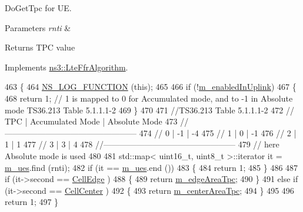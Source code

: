 Do\+Get\+Tpc for UE. 


\begin{DoxyParams}{Parameters}
{\em rnti} & \\
\hline
\end{DoxyParams}
\begin{DoxyReturn}{Returns}
T\+PC value 
\end{DoxyReturn}


Implements \hyperlink{classns3_1_1LteFfrAlgorithm_a1c58dea37b4812fcb2a817e3e1c45343}{ns3\+::\+Lte\+Ffr\+Algorithm}.


\begin{DoxyCode}
463 \{
464   \hyperlink{log-macros-disabled_8h_a90b90d5bad1f39cb1b64923ea94c0761}{NS\_LOG\_FUNCTION} (\textcolor{keyword}{this});
465 
466   \textcolor{keywordflow}{if} (!\hyperlink{classns3_1_1LteFfrAlgorithm_a6c681821267dfedf7083600005db4bee}{m\_enabledInUplink})
467     \{
468       \textcolor{keywordflow}{return} 1;     \textcolor{comment}{// 1 is mapped to 0 for Accumulated mode, and to -1 in Absolute mode TS36.213 Table
       5.1.1.1-2}
469     \}
470 
471   \textcolor{comment}{//TS36.213 Table 5.1.1.1-2}
472   \textcolor{comment}{//   TPC   |   Accumulated Mode  |  Absolute Mode}
473   \textcolor{comment}{//------------------------------------------------}
474   \textcolor{comment}{//    0    |         -1          |      -4}
475   \textcolor{comment}{//    1    |          0          |      -1}
476   \textcolor{comment}{//    2    |          1          |       1}
477   \textcolor{comment}{//    3    |          3          |       4}
478   \textcolor{comment}{//------------------------------------------------}
479   \textcolor{comment}{// here Absolute mode is used}
480 
481   std::map< uint16\_t, uint8\_t >::iterator it = \hyperlink{classns3_1_1LteFrStrictAlgorithm_a544356f4520ab4afc2af7fb03c02cf17}{m\_ues}.find (rnti);
482   \textcolor{keywordflow}{if} (it == \hyperlink{classns3_1_1LteFrStrictAlgorithm_a544356f4520ab4afc2af7fb03c02cf17}{m\_ues}.end ())
483     \{
484       \textcolor{keywordflow}{return} 1;
485     \}
486 
487   \textcolor{keywordflow}{if} (it->second == \hyperlink{classns3_1_1LteFrStrictAlgorithm_a70e144d3c83d78ebf979dbad5d191de7a263b073dd1aafaf85a35b5cb245b10e6}{CellEdge} )
488     \{
489       \textcolor{keywordflow}{return} \hyperlink{classns3_1_1LteFrStrictAlgorithm_a54d8fd8e9cb837daf80f9cc6a477d9c1}{m\_edgeAreaTpc};
490     \}
491   \textcolor{keywordflow}{else} \textcolor{keywordflow}{if} (it->second == \hyperlink{classns3_1_1LteFrStrictAlgorithm_a70e144d3c83d78ebf979dbad5d191de7a7455f21b3eabaeef3ec6aec4b9202dea}{CellCenter} )
492     \{
493       \textcolor{keywordflow}{return} \hyperlink{classns3_1_1LteFrStrictAlgorithm_a9929a6d0f943421a03a443a2942706bc}{m\_centerAreaTpc};
494     \}
495 
496   \textcolor{keywordflow}{return} 1;
497 \}
\end{DoxyCode}
